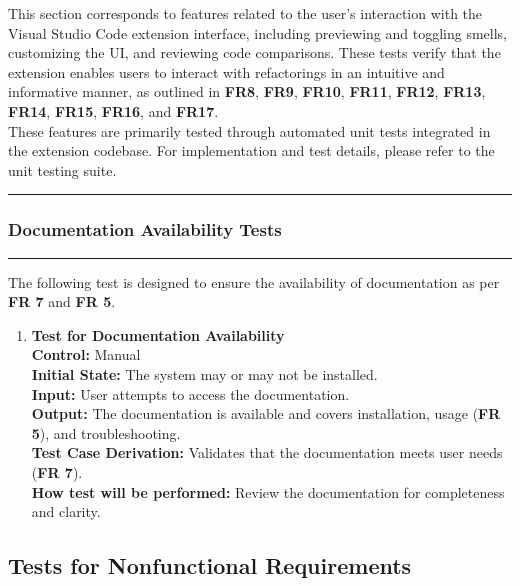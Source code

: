 \documentclass[12pt, titlepage]{article}
\newcommand{\colorrule}{\textcolor{BlueViolet}{\rule{\linewidth}{2pt}}}
\begin{document}
\medskip

\noindent
This section corresponds to features related to the user’s interaction with the Visual Studio Code extension interface, including previewing and toggling smells, customizing the UI, and reviewing code comparisons. These tests verify that the extension enables users to interact with refactorings in an intuitive and informative manner, as outlined in \textbf{FR8}, \textbf{FR9}, \textbf{FR10}, \textbf{FR11}, \textbf{FR12}, \textbf{FR13}, \textbf{FR14}, \textbf{FR15}, \textbf{FR16}, and \textbf{FR17}.\\

\noindent These features are primarily tested through automated unit tests integrated in the extension codebase. For implementation and test details, please refer to the unit testing suite.

\noindent\colorrule

\subsubsection{Documentation Availability Tests}
\colorrule

\medskip

\noindent
The following test is designed to ensure the availability of
documentation as per \textbf{FR 7} and \textbf{FR 5}.

\begin{enumerate}[label={\bf
    \textcolor{Maroon}{test-FR-DA-\arabic*}}, wide=0pt, font=\itshape]
  \item \textbf{Test for Documentation Availability}\\[2mm]
    \textbf{Control:} Manual\\
    \textbf{Initial State:} The system may or may not be installed.\\
    \textbf{Input:} User attempts to access the documentation.\\
    \textbf{Output:} The documentation is available and covers
    installation, usage (\textbf{FR 5}), and troubleshooting.\\[2mm]
    \textbf{Test Case Derivation:} Validates that the documentation
    meets user needs (\textbf{FR 7}).\\[2mm]
    \textbf{How test will be performed:} Review the documentation for
    completeness and clarity.
\end{enumerate}

\subsection{Tests for Nonfunctional Requirements}
\end{document}
